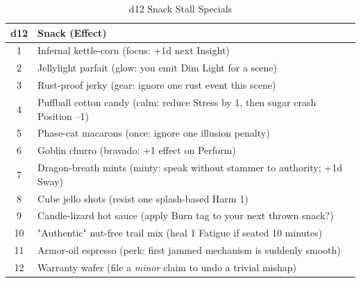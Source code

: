 \begin{table}[h]
\centering
\caption{d12 Snack Stall Specials}
\label{tab:snacks}
\begin{tabular}{@{}cl@{}}
\toprule
d12 & Snack (Effect) \\
\midrule
1 & Infernal kettle-corn (focus: +1d next Insight) \\
2 & Jellylight parfait (glow: you emit Dim Light for a scene) \\
3 & Rust-proof jerky (gear: ignore one rust event this scene) \\
4 & Puffball cotton candy (calm: reduce Stress by 1, then sugar crash Position --1) \\
5 & Phase-cat macarons (once: ignore one illusion penalty) \\
6 & Goblin churro (bravado: +1 effect on Perform) \\
7 & Dragon-breath mints (minty: speak without stammer to authority; +1d Sway) \\
8 & Cube jello shots (resist one splash-based Harm 1) \\
9 & Candle-lizard hot sauce (apply Burn tag to your next thrown snack?) \\
10 & "Authentic" nut-free trail mix (heal 1 Fatigue if seated 10 minutes) \\
11 & Armor-oil espresso (perk: first jammed mechanism is suddenly smooth) \\
12 & Warranty wafer (file a \emph{minor} claim to undo a trivial mishap) \\
\bottomrule
\end{tabular}
\end{table}

